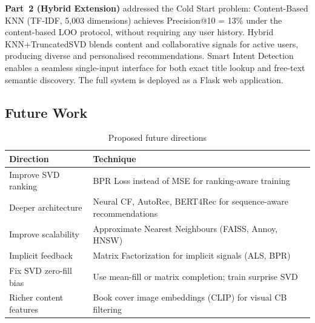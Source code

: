 \documentclass[12pt, a4paper]{article}
\begin{document}
\textbf{Part~2 (Hybrid Extension)} addressed the Cold Start problem:
Content-Based KNN (TF-IDF, 5,003 dimensions) achieves Precision@10 = 13\%
under the content-based LOO protocol, without requiring any user history.
Hybrid KNN+TruncatedSVD blends content and collaborative signals for active users,
producing diverse and personalised recommendations.
Smart Intent Detection enables a seamless single-input interface for
both exact title lookup and free-text semantic discovery.
The full system is deployed as a Flask web application.

\subsection{Future Work}

\begin{table}[H]
  \centering
  \caption{Proposed future directions}
  \label{tab:future}
  \begin{tabular}{|p{4cm}|p{9cm}|}
    \hline
    \textbf{Direction}       & \textbf{Technique} \\
    \hline
    Improve SVD ranking      & BPR Loss instead of MSE for ranking-aware training \\
    \hline
    Deeper architecture      & Neural CF, AutoRec, BERT4Rec for sequence-aware recommendations \\
    \hline
    Improve scalability      & Approximate Nearest Neighbours (FAISS, Annoy, HNSW) \\
    \hline
    Implicit feedback        & Matrix Factorization for implicit signals (ALS, BPR) \\
    \hline
    Fix SVD zero-fill bias   & Use mean-fill or matrix completion; train surprise SVD \\
    \hline
    Richer content features  & Book cover image embeddings (CLIP) for visual CB filtering \\
    \hline
  \end{tabular}
\end{table}
\end{document}
